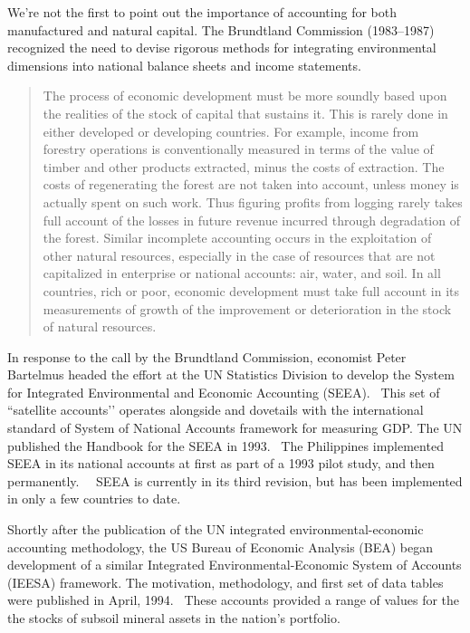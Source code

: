 We're not the first to point out the importance of accounting for both manufactured and natural capital. The Brundtland Commission (1983--1987) recognized the need to devise rigorous methods for integrating environmental dimensions into national balance sheets and income statements.

\begin{quote}
The process of economic development must be more soundly based upon the realities of the stock of capital that sustains it. This is rarely
 done in either developed or developing countries. For example, income from forestry operations is conventionally measured in terms of
 the value of timber and other products extracted, minus the costs of extraction. The costs of regenerating the forest are not taken into 
account, unless money is actually spent on such work. Thus figuring profits from logging rarely takes full 
account of the losses in future revenue incurred through degradation of the forest. Similar incomplete 
accounting occurs in the exploitation of other natural resources, especially in the case of resources that 
are not capitalized in enterprise or national accounts: air, water, and soil. In all countries, rich or poor, 
economic development must take full account in its measurements of growth of the improvement or 
deterioration in the stock of natural resources.~\cite[Chapter 2, para 36]{brundtland1987}
\end{quote}

In response to the call by the Brundtland Commission, economist Peter Bartelmus headed the effort at the UN Statistics Division to
 develop the System for Integrated Environmental and Economic Accounting (SEEA).~\cite{Bartelmus1991} This set of ``satellite
 accounts’’ operates alongside and dovetails with the international standard of System of National Accounts framework for measuring
 GDP. The UN published the Handbook for the SEEA in 1993.~\cite{UNSEEA1993} The Philippines implemented SEEA in its national
 accounts at first as part of a 1993 pilot study, and then permanently.~\cite{uno1998}~\cite{PhilippinesSEEAWeb} SEEA  is currently in
 its third revision, but has been implemented in only a few countries to date.~\cite{UNSEEAWeb}~\cite{PhilippinesSEEAWeb} 

Shortly after the publication of the UN integrated environmental-economic accounting methodology, the US Bureau of Economic Analysis (BEA) began development of a similar Integrated Environmental-Economic System of Accounts (IEESA) framework. The motivation, methodology, and first set of data tables were published in April, 1994.~\cite{BEA1994a} These accounts provided a range of values for the the stocks of subsoil mineral assets in the nation’s portfolio. 

